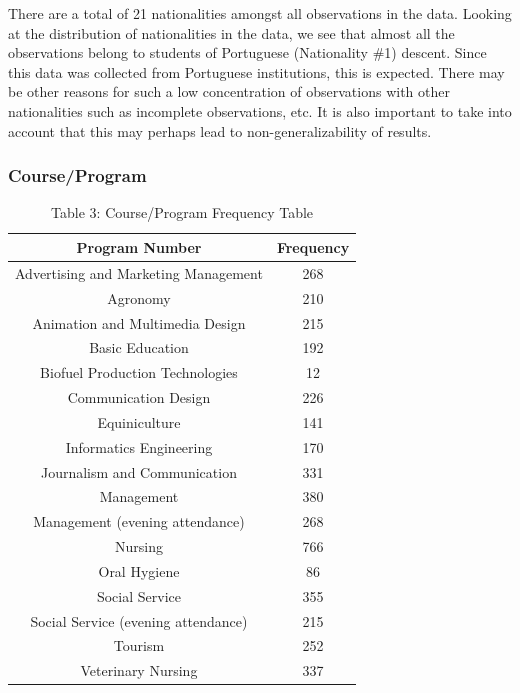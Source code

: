 \documentclass[
]{article}
\begin{document}
There are a total of 21 nationalities amongst all observations in the
data. Looking at the distribution of nationalities in the data, we see
that almost all the observations belong to students of Portuguese
(Nationality \#1) descent. Since this data was collected from Portuguese
institutions, this is expected. There may be other reasons for such a
low concentration of observations with other nationalities such as
incomplete observations, etc. It is also important to take into account
that this may perhaps lead to non-generalizability of results.

\hypertarget{courseprogram}{%
\subsubsection{Course/Program}\label{courseprogram}}

\begin{table}

\caption{\label{tab:unnamed-chunk-8}Table 3: Course/Program Frequency Table}
\centering
\begin{tabular}[t]{c|c}
\hline
Program Number & Frequency\\
\hline
Advertising and Marketing Management & 268\\
\hline
Agronomy & 210\\
\hline
Animation and Multimedia Design & 215\\
\hline
Basic Education & 192\\
\hline
Biofuel Production Technologies & 12\\
\hline
Communication Design & 226\\
\hline
Equiniculture & 141\\
\hline
Informatics Engineering & 170\\
\hline
Journalism and Communication & 331\\
\hline
Management & 380\\
\hline
Management (evening attendance) & 268\\
\hline
Nursing & 766\\
\hline
Oral Hygiene & 86\\
\hline
Social Service & 355\\
\hline
Social Service (evening attendance) & 215\\
\hline
Tourism & 252\\
\hline
Veterinary Nursing & 337\\
\hline
\end{tabular}
\end{table}
\end{document}
